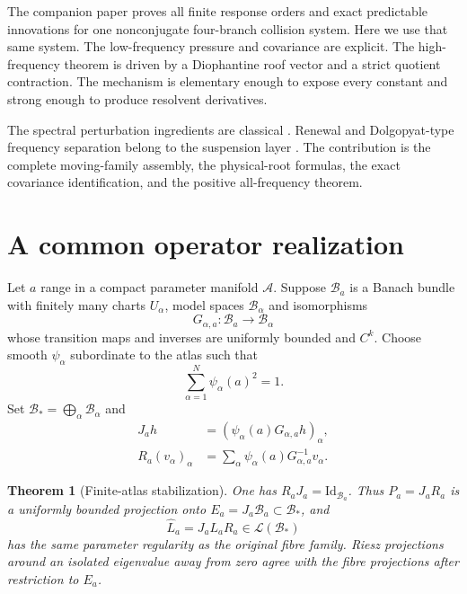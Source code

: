 \documentclass[11pt,reqno]{amsart}
\newtheorem{theorem}{Theorem}[section]
\theoremstyle{definition}
\theoremstyle{remark}
\newcommand{\A}{\mathcal A}
\newcommand{\B}{\mathcal B}
\newcommand{\Id}{\mathrm{Id}}
\begin{document}
The companion paper proves all finite response orders and exact predictable
innovations for one nonconjugate four-branch collision system.  Here we use
that same system.  The low-frequency pressure and covariance are explicit.
The high-frequency theorem is driven by a Diophantine roof vector and a strict
quotient contraction.  The mechanism is elementary enough to expose every
constant and strong enough to produce resolvent derivatives.

The spectral perturbation ingredients are classical
\cite{Kato1995,KellerLiverani1999,ParryPollicott1990}.  Renewal and
Dolgopyat-type frequency separation belong to the suspension layer
\cite{Dolgopyat1998,ButterleyLiverani2007}.  The contribution is the complete
moving-family assembly, the physical-root formulas, the exact covariance
identification, and the positive all-frequency theorem.

\section{A common operator realization}\label{sec:common}

Let $a$ range in a compact parameter manifold $\A$.  Suppose $\B_a$ is a
Banach bundle with finitely many charts $U_\alpha$, model spaces $\B_\alpha$
and isomorphisms
\[
 G_{\alpha,a}:\B_a\longrightarrow\B_\alpha
\]
whose transition maps and inverses are uniformly bounded and $C^k$.
Choose smooth $\psi_\alpha$ subordinate to the atlas such that
\begin{equation}\label{eq:quadratic-partition}
 \sum_{\alpha=1}^N\psi_\alpha(a)^2=1.
\end{equation}
Set $\B_*=\bigoplus_\alpha\B_\alpha$ and
\begin{align}
 J_ah&=(\psi_\alpha(a)G_{\alpha,a}h)_\alpha,
 \label{eq:J}\\
 R_a(v_\alpha)_\alpha&=
 \sum_\alpha\psi_\alpha(a)G_{\alpha,a}^{-1}v_\alpha.
 \label{eq:R}
\end{align}

\begin{theorem}[Finite-atlas stabilization]\label{thm:stabilization}
One has $R_aJ_a=\Id_{\B_a}$.  Thus $P_a=J_aR_a$ is a uniformly bounded
projection onto $E_a=J_a\B_a\subset\B_*$, and
\[
 \widehat L_a=J_aL_aR_a\in\mathcal L(\B_*)
\]
has the same parameter regularity as the original fibre family.  Riesz
projections around an isolated eigenvalue away from zero agree with the fibre
projections after restriction to $E_a$.
\end{theorem}
\end{document}
